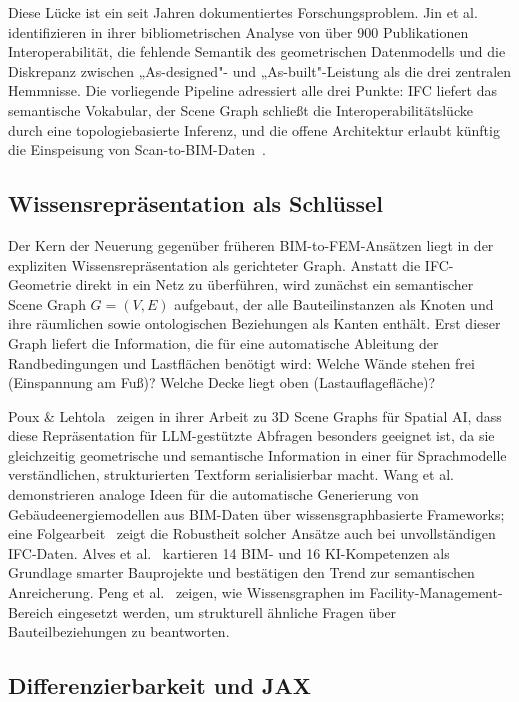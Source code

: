 \documentclass[a4paper,11pt]{article}
\begin{document}
Diese Lücke ist ein seit Jahren dokumentiertes Forschungsproblem. Jin et al.~\cite{jin2019bim} identifizieren in ihrer bibliometrischen Analyse von über 900 Publikationen Interoperabilität, die fehlende Semantik des geometrischen Datenmodells und die Diskrepanz zwischen „As-designed"- und „As-built"-Leistung als die drei zentralen Hemmnisse. Die vorliegende Pipeline adressiert alle drei Punkte: IFC liefert das semantische Vokabular, der Scene Graph schließt die Interoperabilitätslücke durch eine topologiebasierte Inferenz, und die offene Architektur erlaubt künftig die Einspeisung von Scan-to-BIM-Daten~\cite{chen2026scan,mahmoud2026scan}.

\subsection{Wissensrepräsentation als Schlüssel}

Der Kern der Neuerung gegenüber früheren BIM-to-FEM-Ansätzen liegt in der expliziten Wissensrepräsentation als gerichteter Graph. Anstatt die IFC-Geometrie direkt in ein Netz zu überführen, wird zunächst ein semantischer Scene Graph $G = (V, E)$ aufgebaut, der alle Bauteilinstanzen als Knoten und ihre räumlichen sowie ontologischen Beziehungen als Kanten enthält. Erst dieser Graph liefert die Information, die für eine automatische Ableitung der Randbedingungen und Lastflächen benötigt wird: Welche Wände stehen frei (Einspannung am Fuß)? Welche Decke liegt oben (Lastauflagefläche)?

Poux \& Lehtola~\cite{poux2025scene} zeigen in ihrer Arbeit zu 3D Scene Graphs für Spatial AI, dass diese Repräsentation für LLM-gestützte Abfragen besonders geeignet ist, da sie gleichzeitig geometrische und semantische Information in einer für Sprachmodelle verständlichen, strukturierten Textform serialisierbar macht. Wang et al.~\cite{wang2024kg} demonstrieren analoge Ideen für die automatische Generierung von Gebäudeenergiemodellen aus BIM-Daten über wissensgraphbasierte Frameworks; eine Folgearbeit~\cite{wang2026hvac} zeigt die Robustheit solcher Ansätze auch bei unvollständigen IFC-Daten. Alves et al.~\cite{alves2025bim} kartieren 14 BIM- und 16 KI-Kompetenzen als Grundlage smarter Bauprojekte und bestätigen den Trend zur semantischen Anreicherung. Peng et al.~\cite{peng2024kg} zeigen, wie Wissensgraphen im Facility-Management-Bereich eingesetzt werden, um strukturell ähnliche Fragen über Bauteil\-beziehungen zu beantworten.

\subsection{Differenzierbarkeit und JAX}
\end{document}
